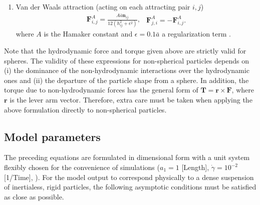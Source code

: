 \begin{enumerate}
\item Van der Waals attraction (acting on each attracting pair $i,j$)
  \begin{subequations}
    \begin{equation} 
      \begin{aligned}
        {\bm F}^A_{i,j} = \frac{A\bar{a} {\bm n}_{ij}}{12(h_{ij}^2+\epsilon^2)}, 
      \end{aligned}
    \end{equation}
    \begin{equation} 
      \begin{aligned}
        {\bm F}^A_{j,i} = -{\bm F}^A_{i,j}.
      \end{aligned}
    \end{equation}
  \end{subequations}
  where $A$ is the Hamaker constant and $\epsilon=0.1\bar{a}$ a regularization term \citep{Singh_attr_prl2019}.

\end{enumerate}

Note that the hydrodynamic force and torque given above are strictly valid for spheres. The validity of these expressions for non-spherical particles depends on (i) the dominance of the non-hydrodynamic interactions over the hydrodynamic ones and (ii) the departure of the particle shape from a sphere. In addition, the torque due to non-hydrodynamic forces has the general form of ${\bm T}= {\bm r} \times {\bm F}$, where ${\bm r}$ is the lever arm vector. Therefore, extra care must be taken when applying the above formulation directly to non-spherical particles.


\subsection{Model parameters}
\label{model param}

The preceding equations are formulated in dimensional form with a unit system flexibly chosen for the convenience of simulations (\eg $a_1=1$ [{\small Length}], $\dot{\gamma}=10^{-2}$ [{\small 1/Time}], \etc). For the model output to correspond physically to a dense suspension of inertialess, rigid particles, the following asymptotic conditions must be satisfied as close as possible.

